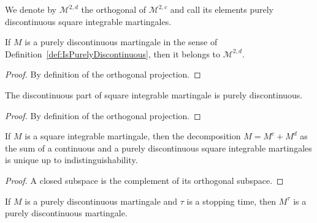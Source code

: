 \begin{definition}\label{def:discontinuousSquareIntegrable}
  \leanok
We denote by $\mathcal{M}^{2,d}$ the orthogonal of $\mathcal{M}^{2,c}$ and call its elements purely discontinuous square integrable martingales.
\end{definition}


\begin{lemma}\label{lem:mem_discontinuousSquareIntegrable}
  \leanok
If $M$ is a purely discontinuous martingale in the sense of Definition~\ref{def:IsPurelyDiscontinuous}, then it belongs to $\mathcal{M}^{2,d}$.
\end{lemma}

\begin{proof}
  \leanok
By definition of the orthogonal projection.
\end{proof}


\begin{lemma}\label{lem:isPurelyDiscontinuous_discontinuousPart}
  \leanok
The discontinuous part of square integrable martingale is purely discontinuous.
\end{lemma}

\begin{proof}
  \leanok
By definition of the orthogonal projection.
\end{proof}


\begin{lemma}\label{lem:unique_continuousPart}
  \leanok
If $M$ is a square integrable martingale, then the decomposition $M = M^c + M^d$ as the sum of a continuous and a purely discontinuous square integrable martingales is unique up to indistinguishability.
\end{lemma}

\begin{proof}
  \leanok
A closed subspace is the complement of its orthogonal subspace.
\end{proof}


\begin{lemma}\label{lem:IsPurelyDiscontinuous.stoppedProcess}
  \leanok
If $M$ is a purely discontinuous martingale and $\tau$ is a stopping time, then $M^\tau$ is a purely discontinuous martingale.
\end{lemma}

